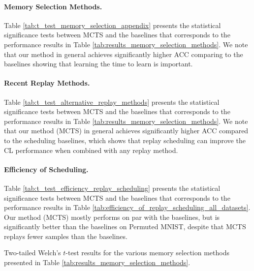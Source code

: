 \vspace{-3mm}
\paragraph{Memory Selection Methods.} Table \ref{tab:t_test_memory_selection_appendix} presents the statistical significance tests between MCTS and the baselines that corresponds to the performance results in Table \ref{tab:results_memory_selection_methods}. We note that our method in general achieves significantly higher ACC comparing to the baselines showing that learning the time to learn is important.



\vspace{-3mm}
\paragraph{Recent Replay Methods.} Table \ref{tab:t_test_alternative_replay_methods} presents the statistical significance tests between MCTS and the baselines that corresponds to the performance results in Table \ref{tab:results_memory_selection_methods}. We note that our method (MCTS) in general achieves significantly higher ACC compared to the scheduling baselines, which shows that replay scheduling can improve the CL performance when combined with any replay method. 


\vspace{-3mm}
\paragraph{Efficiency of Scheduling.} Table \ref{tab:t_test_efficiency_replay_scheduling} presents the statistical significance tests between MCTS and the baselines that corresponds to the performance results in Table \ref{tab:efficiency_of_replay_scheduling_all_datasets}. Our method (MCTS) mostly performs on par with the baselines, but is significantly better than the baselines on Permuted MNIST, despite that MCTS replays fewer samples than the baselines.




\begin{table}[h]
	\centering
	\caption{Two-tailed Welch's $t$-test results for the various memory selection methods presented in Table \ref{tab:results_memory_selection_methods}. 
	}
	\vspace{-3mm}
	\resizebox{0.92\textwidth}{!}{
		
	}
	\vspace{-3mm}
	\label{tab:t_test_memory_selection_appendix}
\end{table}


